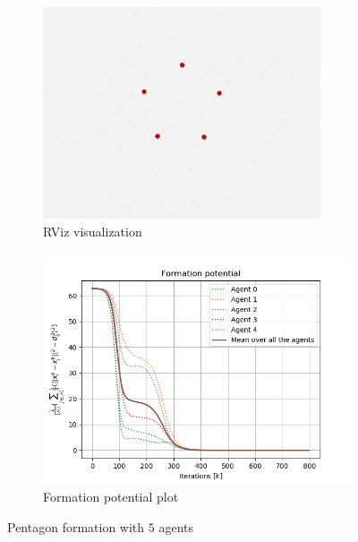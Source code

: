 \documentclass[a4paper,11pt,oneside]{book}
\begin{document}
\begin{figure}[h]
\centering
	\begin{subfigure}{0.49\textwidth}	
	\centering
	\includegraphics[width=0.9\textwidth]{pentagon_rviz.png}
	\caption{RViz visualization}
	\end{subfigure}
\hfill
	\begin{subfigure}{0.49\textwidth}	
	\includegraphics[width=\textwidth]{Formation_potential_pentagon.png}
	\caption{Formation potential plot}
	\end{subfigure}
\caption{Pentagon formation with $5$ agents}
\label{Pentagon}
\end{figure}
\end{document}

